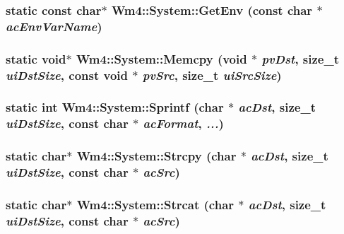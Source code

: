 \subsubsection{\setlength{\rightskip}{0pt plus 5cm}static const char$\ast$ Wm4::System::Get\-Env (const char $\ast$ {\em ac\-Env\-Var\-Name})\hspace{0.3cm}{\tt  [static]}}\label{classWm4_1_1System_49cd19097e976c709101789c3a7582c7}


\subsubsection{\setlength{\rightskip}{0pt plus 5cm}static void$\ast$ Wm4::System::Memcpy (void $\ast$ {\em pv\-Dst}, size\_\-t {\em ui\-Dst\-Size}, const void $\ast$ {\em pv\-Src}, size\_\-t {\em ui\-Src\-Size})\hspace{0.3cm}{\tt  [static]}}\label{classWm4_1_1System_eb8cad2018a4ca7c66012a41bea165ad}


\subsubsection{\setlength{\rightskip}{0pt plus 5cm}static int Wm4::System::Sprintf (char $\ast$ {\em ac\-Dst}, size\_\-t {\em ui\-Dst\-Size}, const char $\ast$ {\em ac\-Format},  {\em ...})\hspace{0.3cm}{\tt  [static]}}\label{classWm4_1_1System_8ea0b5ef972230ec66b1d0ad888060f4}


\subsubsection{\setlength{\rightskip}{0pt plus 5cm}static char$\ast$ Wm4::System::Strcpy (char $\ast$ {\em ac\-Dst}, size\_\-t {\em ui\-Dst\-Size}, const char $\ast$ {\em ac\-Src})\hspace{0.3cm}{\tt  [static]}}\label{classWm4_1_1System_76871a39455735cfb870f0bd2334655b}


\subsubsection{\setlength{\rightskip}{0pt plus 5cm}static char$\ast$ Wm4::System::Strcat (char $\ast$ {\em ac\-Dst}, size\_\-t {\em ui\-Dst\-Size}, const char $\ast$ {\em ac\-Src})\hspace{0.3cm}{\tt  [static]}}\label{classWm4_1_1System_f4448e643b507d29fa12a801f6e73486}


